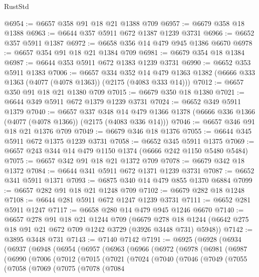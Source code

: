 \begin{lexlean}{RustStd}
\begin{coremodule}
@6954 := @6657 @358 @91 @18 @21 @1388 @709
@6957 := @6679 @358 @18 @1388
@6963 := @6644 @357 @5911 @672 @1387 @1239 @3731
@6966 := @6652 @357 @5911 @1387
@6972 := @6658 @356 @14 @479 @945 @1386 @6670
@6978 := @6657 @354 @91 @18 @21 @1384 @709
@6981 := @6679 @354 @18 @1384
@6987 := @6644 @353 @5911 @672 @1383 @1239 @3731
@6990 := @6652 @353 @5911 @1383
@7006 := @6657
    @334
    @352
    @14
    @479
    @1363
    @1382
    (@6666 @333 @1363 (@4077 (@4078 @1363)) (@2175 (@4083 @333 @14)))
@7012 := @6657 @350 @91 @18 @21 @1380 @709
@7015 := @6679 @350 @18 @1380
@7021 := @6644 @349 @5911 @672 @1379 @1239 @3731
@7024 := @6652 @349 @5911 @1379
@7040 := @6657
    @337
    @348
    @14
    @479
    @1366
    @1378
    (@6666 @336 @1366 (@4077 (@4078 @1366)) (@2175 (@4083 @336 @14)))
@7046 := @6657 @346 @91 @18 @21 @1376 @709
@7049 := @6679 @346 @18 @1376
@7055 := @6644 @345 @5911 @672 @1375 @1239 @3731
@7058 := @6652 @345 @5911 @1375
@7069 := @6657 @243 @344 @14 @479 @1150 @1374 (@6666 @242 @1150 @5480 @5484)
@7075 := @6657 @342 @91 @18 @21 @1372 @709
@7078 := @6679 @342 @18 @1372
@7084 := @6644 @341 @5911 @672 @1371 @1239 @3731
@7087 := @6652 @341 @5911 @1371
@7093 := @6875 @340 @14 @479 @855 @1370 @6884
@7099 := @6657 @282 @91 @18 @21 @1248 @709
@7102 := @6679 @282 @18 @1248
@7108 := @6644 @281 @5911 @672 @1247 @1239 @3731
@7111 := @6652 @281 @5911 @1247
@7117 := @6658 @280 @14 @479 @945 @1246 @6670
@7140 := @6657
    @278
    @91
    @18
    @21
    @1244
    @709
    (@6679 @278 @18 @1244 (@6642 @275 @18 @91 @21 @672 @709 @1242 @3729 (@3926 @3448 @731) @5948))
@7142 := @3895 @3448 @731
@7143 := @7140 @7142
@7191 := @6925
    (@6928
      (@6934
        (@6937
          (@6948
            (@6954
              (@6957
                (@6963
                  (@6966
                    (@6972
                      (@6978
                        (@6981
                          (@6987
                            (@6990
                              (@7006
                                (@7012
                                  (@7015
                                    (@7021
                                      (@7024
                                        (@7040
                                          (@7046
                                            (@7049
                                              (@7055
                                                (@7058
                                                  (@7069
                                                    (@7075
                                                      (@7078
                                                        (@7084

\end{coremodule}
\end{lexlean}
